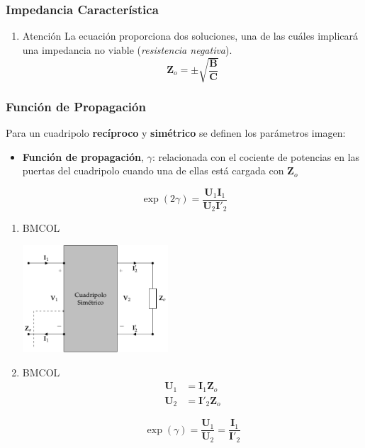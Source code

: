 \subsubsection{Impedancia Característica}
\label{sec:org7144bfc}

\begin{enumerate}
\item Atención
\label{sec:org9042c98}
La ecuación proporciona dos soluciones, una de las cuáles implicará una impedancia no viable (\emph{resistencia negativa}).
\[
\boxed{\mathbf{Z}_o = \pm \sqrt{\frac{\mathbf{B}}{\mathbf{C}}}}
\]
\end{enumerate}

\subsubsection{Función de Propagación}
\label{sec:orgf2ef1cc}
Para un cuadripolo \textbf{recíproco} y \textbf{simétrico} se definen los parámetros imagen:

\begin{itemize}
\item \textbf{Función de propagación}, \(\gamma\): relacionada con el cociente de potencias en las puertas del cuadripolo cuando una de ellas está cargada con \(\mathbf{Z}_o\)
\end{itemize}

\[
  \exp(2\gamma) = \frac{\mathbf{U}_1\mathbf{I}_1}{\mathbf{U}_2\mathbf{I}'_2}
\]

\begin{enumerate}
\item \hfill{}\textsc{BMCOL}
\label{sec:org884522a}

\includegraphics[height=4cm]{../figs/cuadripolo_impedancia_caracteristica.pdf}


\item \hfill{}\textsc{BMCOL}
\label{sec:org13d5d40}
\begin{align*}
  \mathbf{U}_1 &= \mathbf{I}_1 \mathbf{Z}_o\\
  \mathbf{U}_2 &= \mathbf{I}'_2 \mathbf{Z}_o
\end{align*}

\[
  \boxed{\exp(\gamma) = \frac{\mathbf{U}_1}{\mathbf{U}_2} = \frac{\mathbf{I}_1}{\mathbf{I}'_2}}
\]
\end{enumerate}


